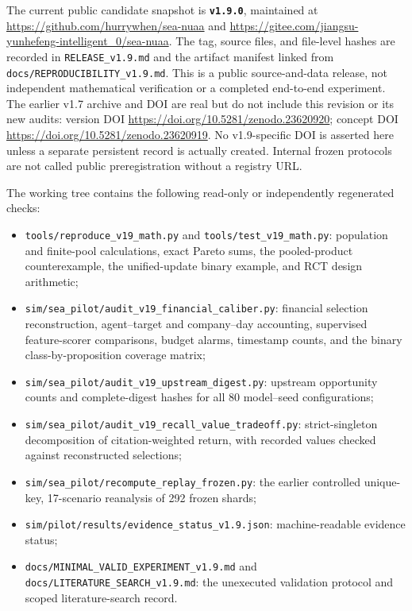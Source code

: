 \documentclass[
  11pt]{article}
\providecommand{\tightlist}{%
  \setlength{\itemsep}{0pt}\setlength{\parskip}{0pt}}
\begin{document}
The current public candidate snapshot is \textbf{\texttt{v1.9.0}},
maintained at \url{https://github.com/hurrywhen/sea-nuaa} and
\url{https://gitee.com/jiangsu-yunhefeng-intelligent_0/sea-nuaa}. The
tag, source files, and file-level hashes are recorded in
\texttt{RELEASE\_v1.9.md} and the artifact manifest linked from
\texttt{docs/REPRODUCIBILITY\_v1.9.md}. This is a public source-and-data
release, not independent mathematical verification or a completed
end-to-end experiment. The earlier v1.7 archive and DOI are real but do
not include this revision or its new audits: version DOI
\url{https://doi.org/10.5281/zenodo.23620920}; concept DOI
\url{https://doi.org/10.5281/zenodo.23620919}. No v1.9-specific DOI is
asserted here unless a separate persistent record is actually created.
Internal frozen protocols are not called public preregistration without
a registry URL.

The working tree contains the following read-only or independently
regenerated checks:

\begin{itemize}
\tightlist
\item
  \texttt{tools/reproduce\_v19\_math.py} and
  \texttt{tools/test\_v19\_math.py}: population and finite-pool
  calculations, exact Pareto sums, the pooled-product counterexample,
  the unified-update binary example, and RCT design arithmetic;
\item
  \texttt{sim/sea\_pilot/audit\_v19\_financial\_caliber.py}: financial
  selection reconstruction, agent--target and company--day accounting,
  supervised feature-scorer comparisons, budget alarms, timestamp
  counts, and the binary class-by-proposition coverage matrix;
\item
  \texttt{sim/sea\_pilot/audit\_v19\_upstream\_digest.py}: upstream
  opportunity counts and complete-digest hashes for all 80 model--seed
  configurations;
\item
  \texttt{sim/sea\_pilot/audit\_v19\_recall\_value\_tradeoff.py}:
  strict-singleton decomposition of citation-weighted return, with
  recorded values checked against reconstructed selections;
\item
  \texttt{sim/sea\_pilot/recompute\_replay\_frozen.py}: the earlier
  controlled unique-key, 17-scenario reanalysis of 292 frozen shards;
\item
  \texttt{sim/pilot/results/evidence\_status\_v1.9.json}:
  machine-readable evidence status;
\item
  \texttt{docs/MINIMAL\_VALID\_EXPERIMENT\_v1.9.md} and
  \texttt{docs/LITERATURE\_SEARCH\_v1.9.md}: the unexecuted validation
  protocol and scoped literature-search record.
\end{itemize}
\end{document}
